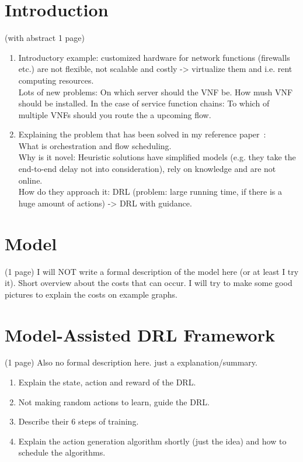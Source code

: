 \begin{abstract}
Abstract.

(The report has the same structure as the original paper~\cite {Gu}. 
I will write more or less every section from the original paper in my own words).
\end{abstract}

\section{Introduction}%
\label{sec:introduction}
(with abstract 1 page)
\begin{enumerate}
\item Introductory example: customized hardware for network functions (firewalls etc.) are not flexible, not scalable and costly -> virtualize them and i.e. rent computing resources.  \\
Lots of new problems: On which server should the VNF be. How mush VNF should be installed.
In the case of service function chains: To which of multiple VNFs should you route the a upcoming flow.

\item Explaining the problem that has been solved in my reference paper~\cite{Gu}: \\
What is orchestration and flow scheduling.\\
Why is it novel: Heuristic solutions have simplified models
 (e.g. they take the end-to-end delay not into consideration), rely on knowledge and are not online.\\
How do they approach it: DRL (problem: large running time, if there is a huge amount of actions) -> DRL with guidance.\\
\end{enumerate}

\section{Model} %
\label{sec:model}
(1 page)
I will NOT write a formal description of the model here (or at least I try it). 
Short overview about the costs that can occur. 
I will try to make some good pictures to explain the costs on example graphs.

\section{Model-Assisted DRL Framework}%
\label{sec:drl}
(1 page)
Also no formal description here. just a explanation/summary.
\begin{enumerate}
\item  Explain the state, action and reward of the DRL.
\item Not making random actions to learn, guide the DRL.
\item Describe their 6 steps of training.
\item Explain the action generation algorithm shortly (just the idea) and how to schedule the algorithms.
\end{enumerate}

